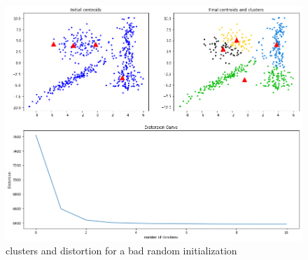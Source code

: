 \documentclass[11pt]{article}
\numberwithin{figure}{section} %
\begin{document}
\begin{figure}[H] 
	\centering
	\includegraphics[width=1\linewidth]{images/bad_case.png}
	\caption{clusters and distortion for a bad random initialization}
	\label{fig:bad_kmeans}
\end{figure}
\end{document}
